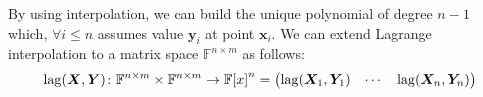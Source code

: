 By using interpolation, we can build the unique polynomial of degree \(n - 1\) which, 
\(\forall i \le n\) assumes value \(\bm{y}_i\) at point \(\bm{x}_i\).
We can extend Lagrange interpolation to a matrix space \(\mathbb{F}^{n \times m}\) as follows:
\[
  \call{\lagrange}{\bm{X}, \bm{Y}}\colon \mathbb{F}^{n \times m} \times \mathbb{F}^{n \times m} \to 
  \extend{\mathbb{F}}{x}^n = 
  \begin{pmatrix*} 
    \call{\lagrange}{\bm{X}_1, \bm{Y}_1} & \cdots & \call{\lagrange}{\bm{X}_n, \bm{Y}_n}
  \end{pmatrix*}
\]
